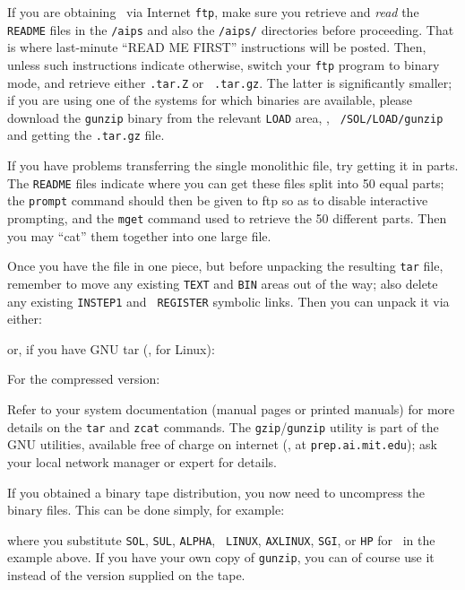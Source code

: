 If you are obtaining \AIPS\ via Internet {\tt ftp}, make sure you
retrieve and {\it read\/} the {\tt README} files in the {\tt /aips} and
also the {\tt /aips/\THISVER} directories before proceeding.  That is
where last-minute ``READ ME FIRST'' instructions will be posted.  Then,
unless such instructions indicate otherwise, switch your {\tt ftp}
program to binary mode, and retrieve either {\tt \THISVER.tar.Z} or {\tt
\THISVER.tar.gz}.  The latter is significantly smaller; if you are using
one of the systems for which binaries are available, please download the
{\tt gunzip} binary from the relevant {\tt LOAD} area, \eg, {\tt
\THISVER/SOL/LOAD/gunzip} and getting the {\tt .tar.gz} file.

If you have problems transferring the single monolithic file, try
getting it in parts.  The {\tt README} files indicate where you can get
these files split into 50 equal parts; the {\tt prompt} command should
then be given to ftp so as to disable interactive prompting, and the
{\tt mget} command used to retrieve the 50 different parts.  Then you
may ``cat'' them together into one large file.

Once you have the file in one piece, but before unpacking the resulting
{\tt tar} file, remember to move any existing {\tt TEXT} and {\tt BIN}
areas out of the way; also delete any existing {\tt INSTEP1} and {\tt
REGISTER} symbolic links.  Then you can unpack it via either:\medskip

\medskip

\noindent or, if you have GNU tar (\eg, for Linux):\medskip

\medskip

\noindent For the compressed version:\medskip

\medskip

\noindent Refer to your system documentation (manual pages or printed
manuals) for more details on the {\tt tar} and {\tt zcat} commands.  The
{\tt gzip}/{\tt gunzip} utility is part of the GNU utilities, available
free of charge on internet (\eg, at {\tt prep.ai.mit.edu}); ask your
local network manager or expert for details.

If you obtained a binary tape distribution, you now need to uncompress
the binary files.  This can be done simply, for example:\medskip

\medskip

\noindent where you substitute {\tt SOL}, {\tt SUL}, {\tt ALPHA}, {\tt
LINUX}, {\tt AXLINUX}, {\tt SGI}, or {\tt HP} for \ARCH\ in the example
above.  If you have your own copy of {\tt gunzip}, you can of course use
it instead of the version supplied on the tape.

